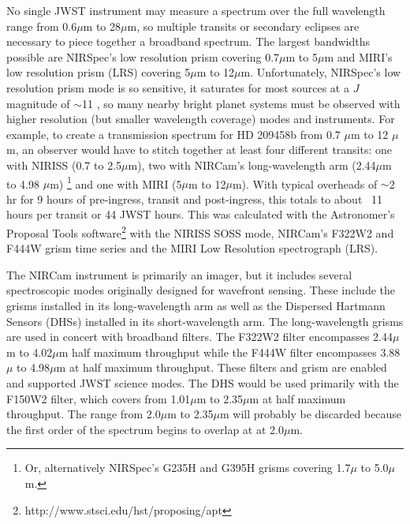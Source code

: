 \documentclass[iop]{emulateapj}
\begin{document}
No single JWST instrument may measure a spectrum over the full wavelength range from 0.6$\mu$m to 28$\mu$m, so multiple transits or secondary eclipses are necessary to piece together a broadband spectrum.
The largest bandwidths possible are NIRSpec's low resolution prism covering 0.7$\mu$m to 5$\mu$m and MIRI's low resolution prism (LRS) covering 5$\mu$m to 12$\mu$m.
Unfortunately, NIRSpec's low resolution prism mode is so sensitive, it saturates for most sources at a $J$ magnitude of $\sim$11 \citep{beichman2014pasp}, so many nearby bright planet systems must be observed with higher resolution (but smaller wavelength coverage) modes and instruments.
For example, to create a transmission spectrum for HD 209458b \citep{henry00,charbonneau00} from 0.7 $\mu$m to 12 $\mu$m, an observer would have to stitch together at least four different transits: one with NIRISS (0.7 to 2.5$\mu$m), two with NIRCam's long-wavelength arm (2.44$\mu$m to 4.98 $\mu$m) \footnote{Or, alternatively NIRSpec's G235H and G395H  grisms covering 1.7$\mu$ to 5.0$\mu$m.} and one with MIRI (5$\mu$m to 12$\mu$m).
With typical overheads of $\sim$2 hr for 9 hours of pre-ingress, transit and post-ingress, this totals to about ~11 hours per transit or 44 JWST hours.
This was calculated with the Astronomer's Proposal Tools software\footnote{http://www.stsci.edu/hst/proposing/apt} with the NIRISS SOSS mode, NIRCam's F322W2 and F444W grism time series and the MIRI Low Resolution spectrograph (LRS).

The NIRCam instrument is primarily an imager, but it includes several spectroscopic modes originally designed for wavefront sensing.
These include the grisms installed in its long-wavelength arm as well as the Dispersed Hartmann Sensors (DHSs) installed in its short-wavelength arm.
The long-wavelength grisms are used in concert with broadband filters.
The F322W2 filter encompasses 2.44$\mu$m to 4.02$\mu$m half maximum throughput while the F444W filter encompasses 3.88$\mu$ to 4.98$\mu$m at half maximum throughput.
These filters and grism are enabled and supported JWST science modes.
The DHS would be used primarily with the F150W2 filter, which covers from 1.01$\mu$m to 2.35$\mu$m at half maximum throughput.
The range from 2.0$\mu$m to 2.35$\mu$m will probably be discarded because the first order of the spectrum begins to overlap at at 2.0$\mu$m.
\end{document}

